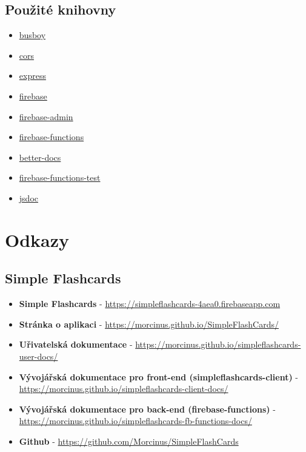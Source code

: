 \documentclass[a4paper,12pt]{article}
\begin{document}
\subsection{Použité knihovny}
\begin{itemize}
\item
  \href{https://www.npmjs.com/package/busboy}{busboy}
\item
  \href{https://www.npmjs.com/package/cors}{cors}
\item
  \href{https://www.npmjs.com/package/express}{express}
\item
  \href{https://www.npmjs.com/package/firebase}{firebase}
\item
  \href{https://www.npmjs.com/package/firebase-admin}{firebase-admin}
\item
  \href{https://www.npmjs.com/package/firebase-functions}{firebase-functions}
\item
  \href{https://www.npmjs.com/package/better-docs}{better-docs}
\item
  \href{https://www.npmjs.com/package/firebase-functions-test}{firebase-functions-test}
\item
  \href{https://www.npmjs.com/package/jsdoc}{jsdoc}
\end{itemize}

\section{Odkazy}
\subsection{Simple Flashcards}
\begin{itemize}
\item \textbf{Simple Flashcards} - \href{https://simpleflashcards-4aea0.firebaseapp.com}{https://simpleflashcards-4aea0.firebaseapp.com}
\item \textbf{Stránka o aplikaci} - \href{https://morcinus.github.io/SimpleFlashCards/}{https://morcinus.github.io/SimpleFlashCards/}
\item \textbf{Uřivatelská dokumentace} - \href{https://morcinus.github.io/simpleflashcards-user-docs/}{https://morcinus.github.io/simpleflashcards-user-docs/}
\item \textbf{Vývojářská dokumentace pro front-end (simpleflashcards-client)} - \href{https://morcinus.github.io/simpleflashcards-client-docs/}{https://morcinus.github.io/simpleflashcards-client-docs/}
\item \textbf{Vývojářská dokumentace pro back-end (firebase-functions)} - \href{https://morcinus.github.io/simpleflashcards-fb-functions-docs/}{https://morcinus.github.io/simpleflashcards-fb-functions-docs/}
\item \textbf{Github} - \href{https://github.com/Morcinus/SimpleFlashCards}{https://github.com/Morcinus/SimpleFlashCards}
\end{itemize}
\end{document}
